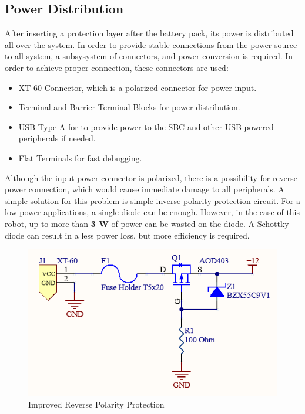 \newpage

\subsection{Power Distribution}
After inserting a protection layer after the battery pack, its power is distributed all over the system. In order to provide stable connections from the power source to all system, a subsysystem of connectors, and power conversion is required.
In order to achieve proper connection, these connectors are used:
\begin{itemize}
	\item XT-60 Connector, which is a polarized connector for power input.
	\item Terminal and Barrier Terminal Blocks for power distribution.
	\item USB Type-A for to provide power to the SBC and other USB-powered peripherals if needed.
	\item Flat Terminals for fast debugging.
\end{itemize}

Although the input power connector is polarized, there is a possibility for reverse power connection, which would cause immediate damage to all peripherals. A simple solution for this problem is simple inverse polarity protection circuit. For a low power applications, a single diode can be enough. However, in the case of this robot, up to more than \textbf{3 W} of power can be wasted on the diode. A Schottky diode can result in a less power loss, but more efficiency is required.

\begin{figure}[h!]
	\centering
	\includegraphics[scale=0.6]{./Figures/HW/reverse-polarity.png}
	\caption{Improved Reverse Polarity Protection}
	\label{fig:hw-reverse}
\end{figure}

